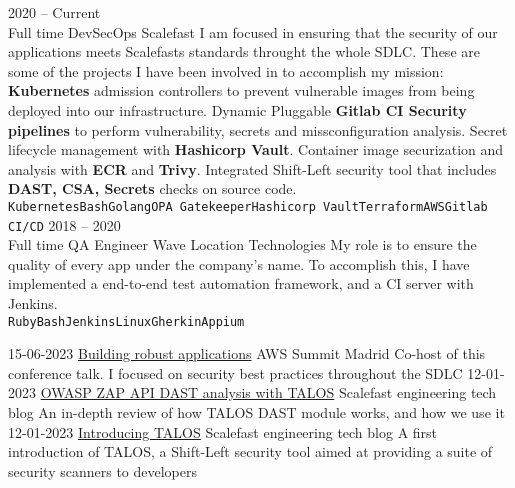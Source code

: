 \documentclass[9pt]{developercv} %
\begin{document}
\begin{entrylist}
	\entry
		{2020 -- Current\\\footnotesize{Full time}}
		{DevSecOps}
		{Scalefast}
		{I am focused in ensuring that the security of our applications meets Scalefasts standards throught the whole SDLC.
		These are some of the projects I have been involved in to accomplish my mission:
		\textbf{Kubernetes} admission controllers to prevent vulnerable images from being deployed into our infrastructure.
		Dynamic Pluggable \textbf{Gitlab CI Security pipelines} to perform vulnerability, secrets and missconfiguration analysis.
		Secret lifecycle management with \textbf{Hashicorp Vault}.
		Container image securization and analysis with \textbf{ECR} and \textbf{Trivy}.
		Integrated Shift-Left security tool that includes \textbf{DAST, CSA, Secrets} checks on source code.
		\\ \texttt{Kubernetes}\slashsep\texttt{Bash}\slashsep\texttt{Golang}\slashsep\texttt{OPA Gatekeeper}\slashsep\texttt{Hashicorp Vault}\slashsep\texttt{Terraform}\slashsep\texttt{AWS}\slashsep\texttt{Gitlab CI/CD}}
	\entry
		{2018 -- 2020\\\footnotesize{Full time}}
		{QA Engineer}
		{Wave Location Technologies}
		{My role is to ensure the quality of every app under the company's name.
		To accomplish this, I have implemented a end-to-end test automation framework, and a CI server with Jenkins.\\ \texttt{Ruby}\slashsep\texttt{Bash}\slashsep\texttt{Jenkins}\slashsep\texttt{Linux}\slashsep\texttt{Gherkin}\slashsep\texttt{Appium}}
\end{entrylist}


\begin{entrylist}
	\entry
	  {15-06-2023}
	  {\href{https://play.vidyard.com/uvjJ6wyme9XUcCjY6U2pTN}{Building robust applications}}
    	  {AWS Summit Madrid}
    	  {Co-host of this conference talk. I focused on security best practices throughout the SDLC}
	\entry
	  {12-01-2023}
	  {\href{https://scalefast.engineering/owasp-zap-api-dast-analysis-with-talos-523c63b860a0}{OWASP ZAP API DAST analysis with TALOS}}
          {Scalefast engineering tech blog}
          {An in-depth review of how TALOS DAST module works, and how we use it}
	\entry
	  {12-01-2023}
	  {\href{https://scalefast.engineering/introducing-talos-fd12c450b48}{Introducing TALOS}}
          {Scalefast engineering tech blog}
          {A first introduction of TALOS, a Shift-Left security tool aimed at providing a suite of security scanners to developers}
\end{entrylist}
\end{document}
